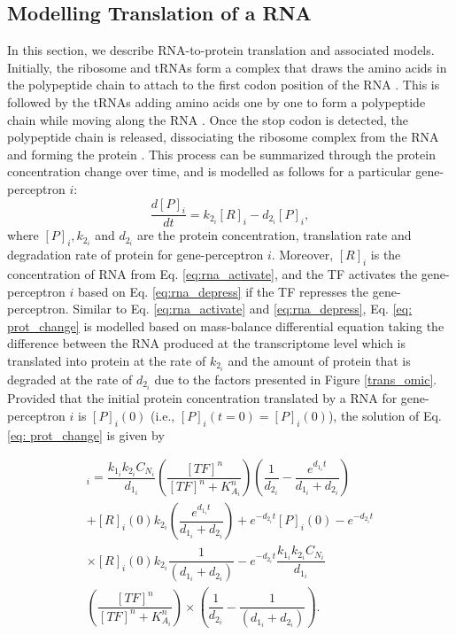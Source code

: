 \documentclass[twocolumn]{biophys-new}
\begin{document}
{{\subsection*{Modelling  Translation of a RNA} \label{RNA_Translation_Models}

In this section, we describe RNA-to-protein translation and associated models.
Initially, the ribosome and tRNAs form a complex that draws the amino acids in the polypeptide chain to attach to the first codon position of the RNA \cite{saito2020translational}. This is followed by the tRNAs adding amino acids one by one to form a polypeptide chain while moving along the RNA \cite{xu2022functions}. Once the stop codon is detected, the polypeptide chain is released, dissociating the ribosome complex from the RNA and forming the protein \cite{marintchev2012fidelity}. This process can be summarized through the protein concentration change over time, and is modelled as follows for a particular gene-perceptron $i$:
\vspace{-0.2em}
\begin{equation}
    \dfrac{d[P]_i}{dt} = k_{2_i}[R]_i - d_{2_i} [P]_i,  \label{eq: prot_change}
\end{equation} 
where $[P]_i, k_{2_i}$ and $d_{2_i}$ are the protein concentration, translation rate and degradation rate of protein for gene-perceptron $i$. Moreover, $[R]_i$ is the concentration of RNA from Eq. \ref{eq:rna_activate}, and the TF activates the gene-perceptron $i$ based on Eq. \ref{eq:rna_depress} if the TF represses the gene-perceptron. Similar to Eq. \ref{eq:rna_activate} and  \ref{eq:rna_depress}, Eq. \ref{eq: prot_change} is modelled based on mass-balance differential equation taking the difference between the RNA produced at the transcriptome level which is translated into protein at the rate of $k_{2_i}$ and the amount of protein that is degraded at the rate of $d_{2_i}$ due to the factors presented in Figure \ref{trans_omic}. 
Provided that the initial protein concentration translated by a RNA for gene-perceptron $i$ is $[P]_i(0)$ (i.e., $[P]_i(t=0)=[P]_i(0)$), the solution of Eq. \ref{eq: prot_change} is given by

\begin{multline}
    [P]_i = \dfrac{k_{1_i}k_{2_i}C_{N_i}}{d_{1_i}} \left( \dfrac{[TF]^n}{[TF]^n+ K_{A_i}^n} \right) \left( \dfrac{1}{d_{2_i}} - \dfrac{e^{d_{1_i}t}}{d_{1_i}+d_{2_i} } \right) \\
    + [R]_i(0) k_{2_i} \left(  \dfrac{e^{d_{1_i}t}}{d_{1_i} + d_{2_i}} \right) 
    +e^{-d_{2_i}t}[P]_i(0)  - e^{-d_{2_i}t} \\ \times [R]_i(0) k_{2_i}  \dfrac{1}{(d_{1_i}+d_{2_i})} 
    - e^{-d_{2_i}t}  \dfrac{k_{1_i}k_{2_i} C_{N_i}}{d_{1_i}} \\ \left(  \dfrac{[TF]^n}{[TF]^n+K_{A_i}^n} \right) 
    \times \left( \dfrac{1}{d_{2_i}} - \dfrac{1}{(d_{1_i}+d_{2_i})} \right).
    \label{eq: sol_prot}
\end{multline}

}}
\end{document}
